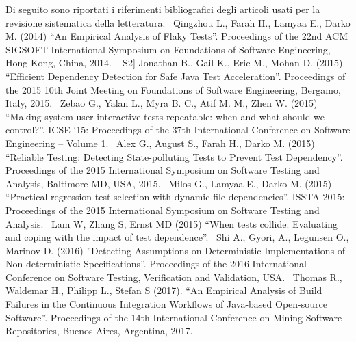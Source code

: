 Di seguito sono riportati i riferimenti bibliografici degli articoli usati per la
revisione sistematica della letteratura.
\newline~\newline
[S1] Qingzhou L., Farah H., Lamyaa E., Darko M. (2014) “An Empirical
Analysis of Flaky Tests”. Proceedings of the 22nd ACM SIGSOFT International
Symposium on Foundations of Software Engineering, Hong Kong, China, 2014.
\newline~\newline
S2] Jonathan B., Gail K., Eric M., Mohan D. (2015) “Efficient
Dependency Detection for Safe Java Test Acceleration”. Proceedings of the 2015
10th Joint Meeting on Foundations of Software Engineering, Bergamo, Italy, 2015.
\newline~\newline
[S3] Zebao G., Yalan L., Myra B. C., Atif M. M., Zhen W. (2015) “Making
system user interactive tests repeatable: when and what should we control?”. ICSE
‘15: Proceedings of the 37th International Conference on Software Engineering –
Volume 1.
\newline~\newline
[S4] Alex G., August S., Farah H., Darko M. (2015) “Reliable Testing:
Detecting State-polluting Tests to Prevent Test Dependency”. Proceedings of the
2015 International Symposium on Software Testing and Analysis, Baltimore MD, USA, 2015.
\newline~\newline
[S5] Milos G., Lamyaa E., Darko M. (2015) “Practical regression test
selection with dynamic file dependencies”. ISSTA 2015: Proceedings of the 2015
International Symposium on Software Testing and Analysis.
\newline~\newline
[S6] Lam W, Zhang S, Ernst MD (2015) “When tests collide: Evaluating
and coping with the impact of test dependence”.
\newline~\newline
[S7] Shi A., Gyori, A., Legunsen O., Marinov D. (2016) ”Detecting
Assumptions on Deterministic Implementations of Non-deterministic Specifications”. Proceedings of the 2016 International Conference on Software Testing, Verification and Validation, USA.
\newline~\newline
[S8] Thomas R., Waldemar H., Philipp L., Stefan S (2017). “An Empirical Analysis of Build Failures in the Continuous Integration Workflows of Java-based
Open-source Software”. Proceedings of the 14th International Conference on Mining Software Repositories, Buenos Aires, Argentina, 2017.
